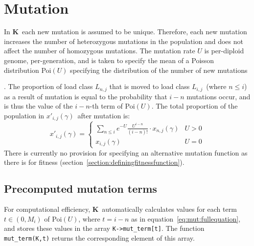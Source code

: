 \documentclass[12pt,twoside,letterpaper,fleqn]{report}
\numberwithin{equation}{section}  %
\newcommand{\K}{{\bf K}}
\newcommand{\ProbDist}[2]{\mbox{{#1}$(#2)$}}
\newcommand{\Mi}{\mbox{$M_{i}$}}
\newcommand{\xijg}{\mbox{$x_{i,j}(\gamma)$}}
\newcommand{\xnjg}{\mbox{$x_{n,j}(\gamma)$}}
\newcommand{\xpijg}{\mbox{$x'_{i,j}(\gamma)$}}
\newcommand{\Lij}{\mbox{$L_{i,j}$}}              %
\begin{document}
\chapter{Mutation}
\label{chapter:mutation}

In \K\ each new mutation is assumed to be unique.  Therefore, each new mutation increases the number of heterozygous mutations in the population and does not affect the number of homozygous mutations.  The mutation rate $U$ is per-diploid genome, per-generation, and is taken to specify the mean of a Poisson distribution \ProbDist{Poi}{U} specifying the distribution of the number of new mutations {\cite[and many others]{Kondrashov:1985:5375,Charlesworth:1990:5337}.  The proportion of load class $L_{n,j}$ that is moved to load class \Lij\ (where $n \le i$) as a result of mutation is equal to the probability that $i-n$ mutations occur, and is thus the value of the $i-n$-th term of \ProbDist{Poi}{U}.  The total proportion of the population in \xpijg\ after mutation is:
\begin{equation}\label{eq:mut:fullequation}
    \xpijg = 
    \begin{cases}
        \sum_{n \le i}{e^{-U} \frac{U^{i-n}}{(i-n)!} \cdot \xnjg} & U > 0 \\
        \xijg & U = 0
    \end{cases}
\end{equation}
There is currently no provision for specifying an alternative mutation function as there is for fitness (section~\ref{section:definingfitnessfunction}).

\section{Precomputed mutation terms}
\label{section:precomputedmutation}

For computational efficiency, \K\ automatically calculates values for each term $t\in(0,\Mi)$ of \ProbDist{Poi}{U}, where $t=i-n$ as in equation~\eqref{eq:mut:fullequation}, and stores these values in the array \lstinline{K->mut_term[t]}.  The function \lstinline{mut_term(K,t)} returns the corresponding element of this array.

}
\end{document}
